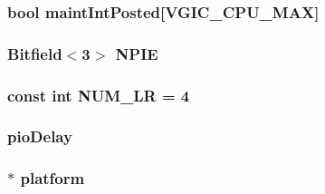 \label{classVGic_a39c00dce99eb5fe8a22703e2286661f5}
\hypertarget{classVGic_afc202b126ba5621ec4dae742b51889d0}{
\subsubsection[{maintIntPosted}]{\setlength{\rightskip}{0pt plus 5cm}bool {\bf maintIntPosted}\mbox{[}{\bf VGIC\_\-CPU\_\-MAX}\mbox{]}}}
\label{classVGic_afc202b126ba5621ec4dae742b51889d0}
\hypertarget{classVGic_aa24f9f3124265bcdf1cea24165b2b0b9}{
\subsubsection[{NPIE}]{\setlength{\rightskip}{0pt plus 5cm}Bitfield$<$3$>$ {\bf NPIE}}}
\label{classVGic_aa24f9f3124265bcdf1cea24165b2b0b9}
\hypertarget{classVGic_a4729ce082ccbd9fef9a9131c6b194204}{
\subsubsection[{NUM\_\-LR}]{\setlength{\rightskip}{0pt plus 5cm}const int {\bf NUM\_\-LR} = 4}}
\label{classVGic_a4729ce082ccbd9fef9a9131c6b194204}
\hypertarget{classVGic_ac8e969635a78ab9ab123904ccca434cc}{
\subsubsection[{pioDelay}]{ {\bf pioDelay}}}
\label{classVGic_ac8e969635a78ab9ab123904ccca434cc}
\hypertarget{classVGic_a75b48f1787959a4617f2a599d7c09aab}{
\subsubsection[{platform}]{$\ast$ {\bf platform}}}
